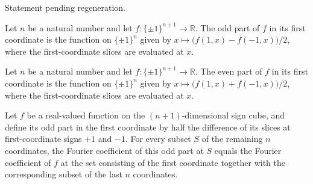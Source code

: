 \begin{theorem}
\label{FABL.uniformInner_noiseOperator_left}
\leanok
{}
Statement pending regeneration.
\end{theorem}

\begin{definition}
\label{FABL.firstCoordinateOddPart}
\leanok
{}
Let $n$ be a natural number and let $f:\{\pm1\}^{n+1}\to\mathbb R$. The odd part of $f$
in its first coordinate is the function on $\{\pm1\}^n$ given by $x\mapsto
\bigl(f(1,x)-f(-1,x)\bigr)/2$, where the first-coordinate slices are evaluated at $x$.
\end{definition}

\begin{definition}
\label{FABL.firstCoordinateEvenPart}
\leanok
{}
Let $n$ be a natural number and let $f:\{\pm1\}^{n+1}\to\mathbb R$. The even part of $f$
in its first coordinate is the function on $\{\pm1\}^n$ given by $x\mapsto
\bigl(f(1,x)+f(-1,x)\bigr)/2$, where the first-coordinate slices are evaluated at $x$.
\end{definition}

\begin{theorem}
\label{FABL.fourierCoeff_firstCoordinateOddPart}
\leanok
{}
Let $f$ be a real-valued function on the $(n+1)$-dimensional sign cube, and define its
odd part in the first coordinate by half the difference of its slices at
first-coordinate signs $+1$ and $-1$. For every subset $S$ of the remaining $n$
coordinates, the Fourier coefficient of this odd part at $S$ equals the Fourier
coefficient of $f$ at the set consisting of the first coordinate together with the
corresponding subset of the last $n$ coordinates.
\end{theorem}

